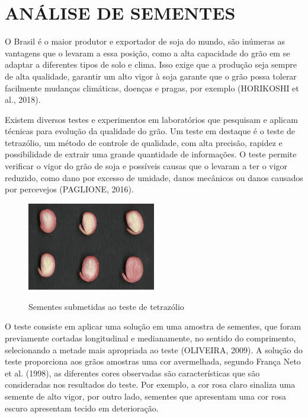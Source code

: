 \section{ANÁLISE DE SEMENTES}
\label{sec:titSecAnalSementes}

O Brasil é o maior produtor e exportador de soja do mundo, são inúmeras as vantagens que o levaram a essa posição, como a alta capacidade do grão em se adaptar a diferentes tipos de solo e clima. Isso exige que a produção seja sempre de alta qualidade, garantir um alto vigor à soja garante que o grão possa tolerar facilmente mudanças climáticas, doenças e pragas, por exemplo (HORIKOSHI et al., 2018).

Existem diversos testes e experimentos em laboratórios que pesquisam e aplicam técnicas para evolução da qualidade do grão. Um teste em destaque é o teste de tetrazólio, um método de controle de qualidade, com alta precisão, rapidez e possibilidade de extrair uma grande quantidade de informações. O teste permite verificar o vigor do grão de soja e possíveis causas que o levaram a ter o vigor reduzido, como dano por excesso de umidade, danos mecânicos ou danos causados por percevejos (PAGLIONE, 2016).

\begin{figure}[!htb]
    \centering
    \caption{Sementes submetidas ao teste de tetrazólio}
    \includegraphics[width=0.5\textwidth]{./dados/figuras/soybean.jpeg}
    \label{fig:figura-sojasTeste}
\end{figure}

O teste consiste em aplicar uma solução em uma amostra de sementes, que foram previamente cortadas longitudinal e medianamente, no sentido do comprimento, selecionando a metade mais apropriada ao teste (OLIVEIRA, 2009). A solução do teste proporciona aos grãos amostras uma cor avermelhada, segundo França Neto et al. (1998), as diferentes cores observadas são características que são consideradas nos resultados do teste. Por exemplo, a cor rosa claro sinaliza uma semente de alto vigor, por outro lado, sementes que apresentam uma cor rosa escuro apresentam tecido em deterioração.

